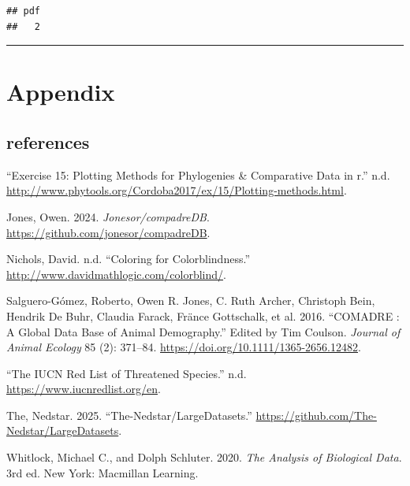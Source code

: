 \documentclass[
]{article}
\newlength{\cslhangindent}
\newenvironment{CSLReferences}[2] %
 {\begin{list}{}{%
  \setlength{\itemindent}{0pt}
  \setlength{\leftmargin}{0pt}
  \setlength{\parsep}{0pt}
  \ifodd #1
   \setlength{\leftmargin}{\cslhangindent}
   \setlength{\itemindent}{-1\cslhangindent}
  \fi
  \setlength{\itemsep}{#2\baselineskip}}}
 {\end{list}}
\begin{document}
\begin{verbatim}
## pdf 
##   2
\end{verbatim}



\begin{center}\rule{0.5\linewidth}{0.5pt}\end{center}

\section{Appendix}\label{appendix}

\subsection{references}\label{references}

\label{refs}
\begin{CSLReferences}{1}{0}
{``Exercise 15: Plotting Methods for Phylogenies \& Comparative Data in
r.''} n.d.
\url{http://www.phytools.org/Cordoba2017/ex/15/Plotting-methods.html}.

Jones, Owen. 2024. \emph{Jonesor/compadreDB}.
\url{https://github.com/jonesor/compadreDB}.

Nichols, David. n.d. {``Coloring for Colorblindness.''}
\url{http://www.davidmathlogic.com/colorblind/}.

Salguero-Gómez, Roberto, Owen R. Jones, C. Ruth Archer, Christoph Bein,
Hendrik De Buhr, Claudia Farack, Fränce Gottschalk, et al. 2016.
{``COMADRE : A Global Data Base of Animal Demography.''} Edited by Tim
Coulson. \emph{Journal of Animal Ecology} 85 (2): 371--84.
\url{https://doi.org/10.1111/1365-2656.12482}.

{``The IUCN Red List of Threatened Species.''} n.d.
\url{https://www.iucnredlist.org/en}.

The, Nedstar. 2025. {``The-Nedstar/LargeDatasets.''}
\url{https://github.com/The-Nedstar/LargeDatasets}.

Whitlock, Michael C., and Dolph Schluter. 2020. \emph{The Analysis of
Biological Data}. 3rd ed. New York: Macmillan Learning.

\end{CSLReferences}
\end{document}

